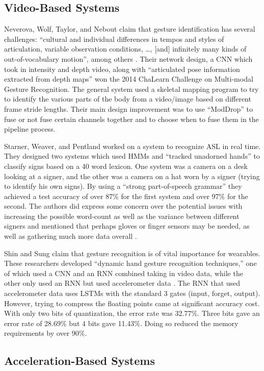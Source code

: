 \documentclass[]{report}
\begin{document}
\subsection{Video-Based Systems}

Neverova, Wolf, Taylor, and Nebout claim that gesture identification has several challenges: “cultural and individual differences in tempos and styles of articulation, variable observation conditions, …, [and] infinitely many kinds of out-of-vocabulary motion”, among others \cite{Neverova}. Their network design, a CNN which took in intensity and depth video, along with “articulated pose information extracted from depth maps” won the 2014 ChaLearn Challenge on Multi-modal Gesture Recognition. The general system used a skeletal mapping program to try to identify the various parts of the body from a video/image based on different frame stride lengths. Their main design improvement was to use “ModDrop” to fuse or not fuse certain channels together and to choose when to fuse them in the pipeline process. 

Starner, Weaver, and Pentland worked on a system to recognize ASL in real time. They designed two systems which used HMMs and “tracked unadorned hands” to classify signs based on a 40 word lexicon. One system was a camera on a desk looking at a signer, and the other was a camera on a hat worn by a signer (trying to identify his own signs). By using a “strong part-of-speech grammar” they achieved a test accuracy of over 87\% for the first system and over 97\% for the second. The authors did express some concern over the potential issues with increasing the possible word-count as well as the variance between different signers and mentioned that perhaps gloves or finger sensors may be needed, as well as gathering much more data overall \cite{Starner98}.

Shin and Sung claim that gesture recognition is of vital importance for wearables. These researchers developed “dynamic hand gesture recognition techniques,” one of which used a CNN and an RNN combined taking in video data, while the other only used an RNN but used accelerometer data \cite{ShinS16}. The RNN that used accelerometer data uses LSTMs with the standard 3 gates (input, forget, output). However, trying to compress the floating points came at significant accuracy cost. With only two bits of quantization, the error rate was 32.77\%. Three bits gave an error rate of 28.69\% but 4 bits gave 11.43\%. Doing so reduced the memory requirements by over 90\%. 

\subsection{Acceleration-Based Systems}
\end{document}

